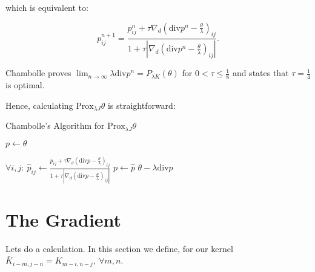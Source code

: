 \documentclass[paper=a4, fontsize=11pt]{scrartcl} %
\numberwithin{equation}{section} %
\numberwithin{figure}{section} %
\numberwithin{table}{section} %
\newcommand{\param}{\theta}
\newcommand{\prox}{\text{Prox}}
\newcommand{\grad}{\nabla_{d} }
\newcommand{\divg}{\text{div}}
\begin{document}
which is equivalent to:

\begin{equation}
p_{ij}^{n+1} = \frac{p_{ij}^{n} + \tau \grad \left (\divg p^{n} - \frac{\param}{\lambda} \right )_{ij}}
{1+ \tau \left | \grad \left ( \divg p^{n} - \frac{\param}{\lambda}\right )_{ij}  \right | }.
\end{equation}

Chambolle \cite[Theorem 3.1]{chambolle2004algorithm} proves $\lim_{n \to \infty} \lambda
\divg p^n = P_{\lambda K}(\param)$ for $0 < \tau \leq \frac{1}{8}$ and
states that $\tau = \frac{1}{4}$ is optimal.

Hence, calculating $\prox_{\lambda J}\param$ is straightforward:

\begin{algorithm}
  \caption{Chambolle's Algorithm for $\prox_{\lambda J}\param$}\label{alg:chambolle}
  \begin{algorithmic}
    \Procedure{Chambolle}{$\param, \lambda$}
    \State $p \gets \param$

    \State $\forall i,j:\ \hat{p}_{ij} \gets \frac{p_{ij} + \tau \grad (\divg p - \frac{\param}{\lambda})_{ij}}
    {1+ \tau | \grad (\divg p - \frac{\param}{\lambda})_{ij}|}$
    \State $p \gets \hat{p}$
    \EndFor
    \Return $\param - \lambda \divg p$
  \end{algorithmic}
\end{algorithm}






\section{The Gradient}
Lets do a calculation. In this section we define, for our kernel
$\bar{K}_{i-m,j-n} = K_{m-i,n-j}, \ \forall m,n$.
\end{document}
